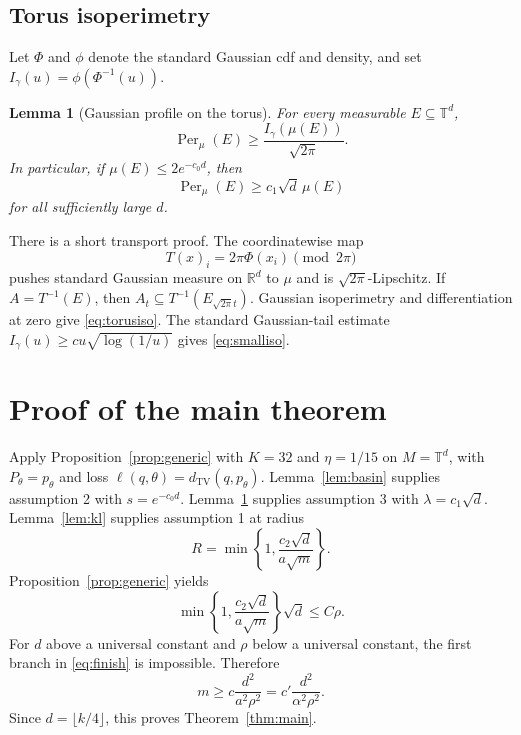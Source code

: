 \documentclass[twoside]{article}
\newtheorem{lemma}[theorem]{Lemma}
\theoremstyle{definition}
\newcommand{\R}{\mathbb R}
\newcommand{\T}{\mathbb T}
\newcommand{\TV}{d_{\mathrm{TV}}}
\newcommand{\1}{\mathbf 1}
\newcommand{\Per}{\operatorname{Per}}
\begin{document}
\subsection{Torus isoperimetry}

Let $\Phi$ and $\phi$ denote the standard Gaussian cdf and density, and set $I_\gamma(u)=\phi(\Phi^{-1}(u))$.

\begin{lemma}[Gaussian profile on the torus]\label{lem:torusiso}
For every measurable $E\subseteq\T^d$,
\begin{equation}
 \Per_\mu(E)\ge\frac{I_\gamma(\mu(E))}{\sqrt{2\pi}}.
 \label{eq:torusiso}
\end{equation}
In particular, if $\mu(E)\le2e^{-c_0d}$, then
\begin{equation}
 \Per_\mu(E)\ge c_1\sqrt d\,\mu(E)
 \label{eq:smalliso}
\end{equation}
for all sufficiently large $d$.
\end{lemma}

There is a short transport proof. The coordinatewise map \[ T(x)_i=2\pi\Phi(x_i)\pmod {2\pi} \] pushes standard Gaussian measure on $\R^d$ to $\mu$ and is $\sqrt{2\pi}$-Lipschitz. If $A=T^{-1}(E)$, then $A_t\subseteq T^{-1}(E_{\sqrt{2\pi}t})$. Gaussian isoperimetry \citep{borell1975,sudakov1978} and differentiation at zero give \eqref{eq:torusiso}. The standard Gaussian-tail estimate $I_\gamma(u)\ge c u\sqrt{\log(1/u)}$ gives \eqref{eq:smalliso}.

\section{Proof of the main theorem}

Apply Proposition~\ref{prop:generic} with $K=32$ and $\eta=1/15$ on $M=\T^d$, with $P_\theta=p_\theta$ and loss $\ell(q,\theta)=\TV(q,p_\theta)$. Lemma~\ref{lem:basin} supplies assumption 2 with $s=e^{-c_0d}$. Lemma~\ref{lem:torusiso} supplies assumption 3 with $\lambda=c_1\sqrt d$. Lemma~\ref{lem:kl} supplies assumption 1 at radius
\begin{equation}
 R=\min\left\{1,\frac{c_2\sqrt d}{a\sqrt m}\right\}.
 \label{eq:R}
\end{equation}
Proposition~\ref{prop:generic} yields
\begin{equation}
 \min\left\{1,\frac{c_2\sqrt d}{a\sqrt m}\right\}
 \sqrt d\le C\rho.
 \label{eq:finish}
\end{equation}
For $d$ above a universal constant and $\rho$ below a universal constant, the first branch in \eqref{eq:finish} is impossible. Therefore \[ m\ge c\frac{d^2}{a^2\rho^2} =c'\frac{d^2}{\alpha^2\rho^2}. \] Since $d=\lfloor k/4\rfloor$, this proves Theorem~\ref{thm:main}.
\end{document}
